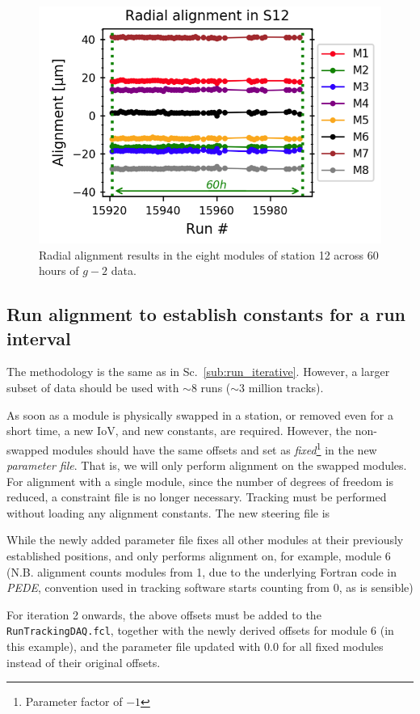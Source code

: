 \documentclass[12pt]{article}
\begin{document}
    \vspace{-0.5cm}
    \begin{figure}[!ht]
    \centering
    \includegraphics[width = 0.5\linewidth]{fig/60h.png}
    \vspace{-0.2cm}
    \caption{Radial alignment results in the eight modules of station 12 across 60 hours of $g-2$ data.}
    \label{fig:60h}
    \end{figure}
\clearpage
\subsection{Run alignment to establish constants for a run interval}\label{sc:run_alignment_to_establish_constants_for_a_run_interval}
The methodology is the same as in Sc.~\ref{sub:run_iterative}. However, a larger subset of data should be used with $\sim8$ runs ($\sim$3 million tracks). 

As soon as a module is physically swapped in a station, or removed even for a short time, a new IoV, and new constants, are required. However, the non-swapped modules should have the same offsets and set as \textit{fixed}\footnote{Parameter factor of $-1$} in the new \textit{parameter file}. That is, we will only perform alignment on the swapped modules. For alignment with a single module, since the number of degrees of freedom is reduced, a constraint file is no longer necessary. Tracking must be performed without loading any alignment constants. The new steering file is

While the newly added parameter file fixes all other modules at their previously established positions, and only performs alignment on, for example, module 6 (N.B. alignment counts modules from 1, due to the underlying Fortran code in \textit{PEDE}, convention used in tracking software starts counting from 0, as is sensible)

For iteration 2 onwards, the above offsets must be added to the \verb!RunTrackingDAQ.fcl!, together with the newly derived offsets for module 6 (in this example), and the parameter file updated with $0.0$ for all fixed modules instead of their original offsets.
\end{document}
